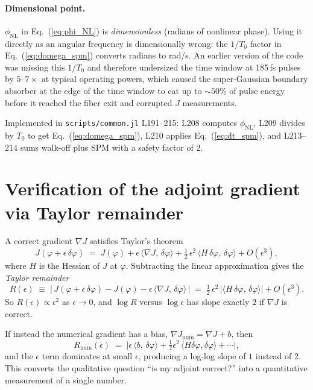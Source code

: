 \documentclass[11pt]{article}
\begin{document}
\paragraph{Dimensional point.} $\phi_\text{NL}$ in Eq.~(\ref{eq:phi_NL}) is
\emph{dimensionless} (radians of nonlinear phase). Using it directly as an
angular frequency is dimensionally wrong: the $1/T_0$ factor in
Eq.~(\ref{eq:domega_spm}) converts radians to rad/s. An earlier version of the
code was missing this $1/T_0$ and therefore undersized the time window at
185\,fs pulses by $5$--$7\times$ at typical operating powers, which caused the
super-Gaussian boundary absorber at the edge of the time window to eat up to
$\sim 50\%$ of pulse energy before it reached the fiber exit and corrupted $J$
measurements.

Implemented in \texttt{scripts/common.jl} L191--215: L208 computes
$\phi_\text{NL}$, L209 divides by $T_0$ to get Eq.~(\ref{eq:domega_spm}), L210
applies Eq.~(\ref{eq:dt_spm}), and L213--214 sums walk-off plus SPM with a
safety factor of 2.

\section{Verification of the adjoint gradient via Taylor remainder}

A correct gradient $\nabla J$ satisfies Taylor's theorem
\begin{equation}
  J(\varphi + \epsilon\,\delta\varphi)
  \;=\; J(\varphi) + \epsilon\,\langle \nabla J,\,\delta\varphi\rangle
        + \tfrac{1}{2}\,\epsilon^2\,\langle H\,\delta\varphi,\,\delta\varphi\rangle
        + O(\epsilon^3),
  \label{eq:taylor_expansion}
\end{equation}
where $H$ is the Hessian of $J$ at $\varphi$. Subtracting the linear
approximation gives the \emph{Taylor remainder}
\begin{equation}
  R(\epsilon) \;\equiv\;
  \bigl|\,J(\varphi + \epsilon\,\delta\varphi) - J(\varphi)
        - \epsilon\,\langle \nabla J,\,\delta\varphi\rangle\,\bigr|
  \;=\; \tfrac{1}{2}\,\epsilon^2\,|\langle H\,\delta\varphi,\,\delta\varphi\rangle|
        + O(\epsilon^3).
  \label{eq:taylor_remainder}
\end{equation}
So $R(\epsilon) \propto \epsilon^2$ as $\epsilon \to 0$, and
$\log R$ versus $\log \epsilon$ has slope exactly $2$ if $\nabla J$ is correct.

If instead the numerical gradient has a bias,
$\nabla J_\text{num} = \nabla J + b$, then
\begin{equation}
  R_\text{num}(\epsilon)
  \;=\; \bigl|\epsilon\,\langle b,\,\delta\varphi\rangle
        + \tfrac{1}{2}\epsilon^2\,\langle H\delta\varphi,\delta\varphi\rangle
        + \cdots\bigr|,
  \label{eq:taylor_biased}
\end{equation}
and the $\epsilon$ term dominates at small $\epsilon$, producing a log-log
slope of $1$ instead of $2$. This converts the qualitative question ``is my
adjoint correct?'' into a quantitative measurement of a single number.
\end{document}

